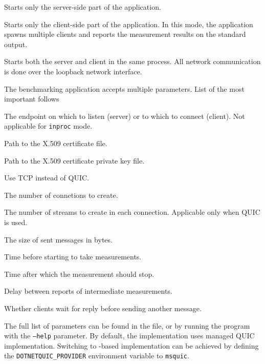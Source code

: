 \begin{description}

   Starts only the server-side part of the application.

   Starts only the client-side part of the application. In this mode, the
application spawns multiple clients and reports the measurement results on the standard output.

   Starts both the server and client in the same process. All network
communication is done over the loopback network interface.

\end{description}

The benchmarking application accepts multiple parameters. List of the most important follows

\begin{description}

     The endpoint on which to listen (server) or to which to connect (client). Not applicable for \texttt{inproc} mode.

     Path to the X.509 certificate file.

     Path to the X.509 certificate private key file.

     Use TCP instead of QUIC\@.

     The number of connetions to create.

     The number of streams to create in each connection. Applicable only when QUIC is used.

     The size of sent messages in bytes.

     Time before starting to take measurements.

     Time after which the measurement should stop.

     Delay between reports of intermediate measurements.

     Whether clients wait for reply before sending another message.

\end{description}

The full list of parameters can be found in the  file, or by running the
program with the \texttt{--help} parameter. By default, the implementation uses managed QUIC
implementation. Switching to \libmsquic{}-based implementation can be achieved by defining the
\texttt{DOTNETQUIC_PROVIDER} environment variable to \texttt{msquic}.


